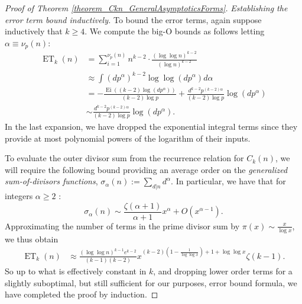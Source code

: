 \documentclass[11pt,reqno,a4letter]{article}
\numberwithin{figure}{section}
\numberwithin{table}{section}
\theoremstyle{plain}
\numberwithin{theorem}{section}
\theoremstyle{definition}
\begin{document}
\begin{proof}[Proof of Theorem \ref{theorem_Ckn_GeneralAsymptoticsForms}]
\textit{Establishing the error term bound inductively.} 
To bound the error terms, again suppose inductively that $k \geq 4$. We compute the 
big-O bounds as follows letting $\alpha \equiv \nu_p(n)$: 
\begin{align*} 
\operatorname{ET}_k(n) & = 
     \sum_{i=1}^{\nu_p(n)} n^{k-2} \cdot \frac{(\log\log n)^{k-2}}{(\log n)^{k-2}} \\ 
     & \approx 
     \int (dp^{\alpha})^{k-2} \log\log(dp^{\alpha}) d\alpha \\ 
     & = -\frac{\operatorname{Ei}((k-2) \log(dp^{\alpha}))}{(k-2) \log p} + 
     \frac{d^{k-2} p^{(k-2)\alpha}}{(k-2) \log p} \log(dp^{\alpha}) \\ 
     & \sim \frac{d^{k-2} p^{(k-2)\alpha}}{(k-2) \log p} \log(dp^{\alpha}). 
\end{align*} 
In the last expansion, we have dropped the exponential integral terms since they provide at most 
polynomial powers of the logarithm of their inputs. 

To evaluate the outer divisor sum from the recurrence relation for $C_k(n)$, we will require the 
following bound providing an average order on the \emph{generalized sum-of-divisors functions}, 
$\sigma_{\alpha}(n) := \sum_{d|n} d^{\alpha}$. In particular, we have that for integers $\alpha \geq 2$ 
\cite[\S 27.11]{NISTHB}: 
\[
\sigma_{\alpha}(n) \sim \frac{\zeta(\alpha+1)}{\alpha+1} x^{\alpha} + O(x^{\alpha-1}). 
\]
Approximating the number of terms in the prime divisor sum by $\pi(x) \sim \frac{x}{\log x}$, 
we thus obtain 
\begin{align*} 
\operatorname{ET}_k(n) & \approx \frac{(\log\log n)^{k-1} e^{k-2}}{(k-1)(k-2)} 
     x^{(k-2)\left(1-\frac{1}{\log\log x}\right)+1+\log\log x} \zeta(k-1). 
\end{align*} 
So up to what is effectively constant in $k$, and dropping lower order terms for a slightly 
suboptimal, but still sufficient for our purposes, error bound formula, 
we have completed the proof by induction. 
\end{proof} 
\end{document}
